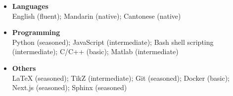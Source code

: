 \documentclass[letterpaper,11pt]{article}
\begin{document}
    \begin{itemize}[leftmargin=0.15in, label={}, itemsep=0em]
        \item \textbf{Languages}\\
        English (fluent); Mandarin (native); Cantonese (native)
        \item \textbf{Programming}\\
        Python (seasoned); JavaScript (intermediate); Bash shell scripting (intermediate); C/C++ (basic); Matlab (intermediate)
        \item \textbf{Others}\\
        LaTeX (seasoned); TikZ (intermediate); Git (seasoned); Docker (basic); Next.js (seasoned); Sphinx (seasoned)
    \end{itemize}
\end{document}
